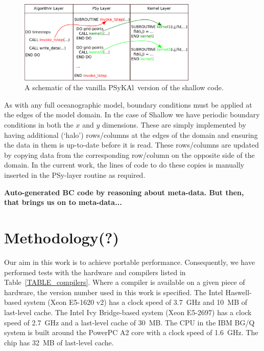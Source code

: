 \documentclass[journal]{IEEEtran}
\newcommand{\psykal}{{PS}y{KA}l\ }
\begin{document}
\begin{figure}
\centering
\includegraphics[width=85mm]{psykal_shallow}
\caption{A schematic of the vanilla \psykal version of the shallow code.}
\label{FIG_psykal_shallow_structure}
\end{figure}

As with any full oceanographic model, boundary conditions must be
applied at the edges of the model domain. In the case of Shallow we
have periodic boundary conditions in both the $x$ and $y$ dimensions.
These are simply implemented by having additional (`halo')
rows/columns at the edges of the domain and ensuring the data in them
is up-to-date before it is read. These rows/columns are updated by
copying data from the corresponding row/column on the opposite side of
the domain. In the current work, the lines of code to do these copies
is manually inserted in the PSy-layer routine as required.

{\bf Auto-generated BC code by reasoning about meta-data. But then,
  that brings us on to meta-data...}

\section{Methodology(?)}

Our aim in this work is to achieve portable performance. Consequently,
we have performed tests with the hardware and compilers listed in
Table~\ref{TABLE_compilers}. Where a compiler is available on a given
piece of hardware, the version number used in this work is specified.
The Intel Haswell-based system (Xeon E5-1620 v2) has a clock speed of
3.7~GHz and 10~MB of last-level cache. The Intel Ivy Bridge-based
system (Xeon E5-2697) has a clock speed of 2.7~GHz and a last-level
cache of 30~MB. The CPU in the IBM BG/Q system is built around the
PowerPC A2 core with a clock speed of 1.6~GHz. The chip has 32~MB of
last-level cache.
\end{document}

